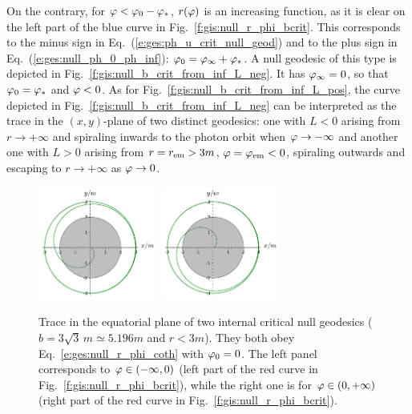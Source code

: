 On the contrary, for $\varphi < \varphi_0 - \varphi_*$,
$r(\varphi)$ is an increasing
function, as it is clear on the left part of the blue curve in Fig.~\ref{f:gis:null_r_phi_bcrit}.
This corresponds to the
minus sign in Eq.~(\ref{e:ges:ph_u_crit_null_geod}) and to the plus sign in
Eq.~(\ref{e:ges:null_ph_0_ph_inf}): $\varphi_0 = \varphi_\infty + \varphi_*$.
A null geodesic of this type is depicted in Fig.~\ref{f:gis:null_b_crit_from_inf_L_neg}.
It has $\varphi_\infty = 0$, so that $\varphi_0 = \varphi_*$ and $\varphi < 0$.
As for Fig.~\ref{f:gis:null_b_crit_from_inf_L_pos}, the curve depicted in
Fig.~\ref{f:gis:null_b_crit_from_inf_L_neg} can be interpreted as the trace
in the $(x,y)$-plane of two distinct
geodesics: one with $L<0$ arising from $r\to + \infty$
and spiraling inwards to the photon orbit when $\varphi\to -\infty$
and another one with $L>0$
arising from $r=r_{\rm em} > 3 m$, $\varphi=\varphi_{\rm em}<0$,
spiraling outwards and escaping to $r\to +\infty$ as $\varphi\to 0$.

\begin{figure}
\centerline{
\includegraphics[width=0.35\textwidth]{ges_null_b_crit_intern_1.pdf}\qquad
\includegraphics[width=0.35\textwidth]{ges_null_b_crit_intern_2.pdf}
}
\caption[]{\label{f:gis:null_b_crit_intern} \footnotesize
Trace in the equatorial plane of two internal critical null geodesics ($b = 3\sqrt{3} \, m \simeq 5.196 m$ and
$r<3m$). They both obey Eq.~\eqref{e:ges:null_r_phi_coth} with $\varphi_0 = 0$.
The left panel corresponds to $\varphi\in (-\infty, 0)$ (left part of the red curve
in Fig.~\ref{f:gis:null_r_phi_bcrit}), while the right one is
for $\varphi\in (0, +\infty)$ (right part of the red curve
in Fig.~\ref{f:gis:null_r_phi_bcrit}).}
\end{figure}


